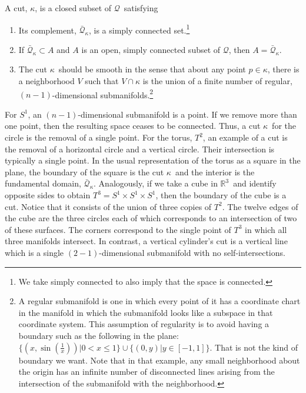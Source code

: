 \documentclass[11pt]{article}
\theoremstyle{remark}
\begin{document}
A cut, \ensuremath{\kappa}, is a closed subset of \ensuremath{\mathcal{Q}}\ satisfying
\begin{enumerate}
\item Its complement, \ensuremath{\bar{\ensuremath{\mathcal{Q}}}_{\ensuremath{\kappa}}}, is a simply connected
set.\footnote{We take simply connected to also imply that the space is
connected. 
}
\item If $\ensuremath{\bar{\ensuremath{\mathcal{Q}}}_{\ensuremath{\kappa}}} \subset A$ and $A$ is an open, simply connected
subset of \ensuremath{\mathcal{Q}}, then $A = \ensuremath{\bar{\ensuremath{\mathcal{Q}}}_{\ensuremath{\kappa}}}$.
\item The cut \ensuremath{\kappa}\ should be smooth in the sense that about any point
$p \in \ensuremath{\kappa}$, there is a neighborhood $V$ such that $V \cap \ensuremath{\kappa}$ is
the union of a finite number of regular, $(n-1)$-dimensional
submanifolds.\footnote{A regular
submanifold is one in which every point of it has a coordinate
chart in the manifold 
in which the submanifold looks like a subspace in that coordinate
system. This assumption of regularity 
is to avoid having a boundary such as the following in
the plane:  
$\{(x, \sin(\frac{1}{x}))| 0<x\leq 1\} \cup \{(0,y)| y \in [-1,1]\}$.
 That is not the kind of boundary we want. Note that in that
example, any small neighborhood about the origin has an
infinite number of disconnected  lines arising from 
the intersection of the submanifold
with the neighborhood.}   
\end{enumerate}


For $S^1$, an $(n-1)$-dimensional submanifold is a point. If we remove
more than one point, then the resulting space ceases to be
connected. Thus, a cut \ensuremath{\kappa}\ for the circle is the removal of a single
point. For the torus, $T^2$, an example of a cut is the removal of a
horizontal circle and a vertical circle. Their intersection is
typically a
single point. In the usual representation of the torus as a square in
the plane, the boundary of the square is the cut \ensuremath{\kappa}\ and the
interior is the fundamental domain, \ensuremath{\bar{\ensuremath{\mathcal{Q}}}_{\ensuremath{\kappa}}}. Analogously,
if we take a cube in \ensuremath{\mathbb{R}^{3}}\ and identify opposite sides to obtain
$T^3 = S^1\times S^1 \times S^1$, then the
boundary of the cube is a cut. Notice that it consists of the union
of three copies of $T^2$. The twelve edges of the cube are the
three circles each of which  corresponds to an intersection of two of these
surfaces. The corners
 correspond to the single point of $T^3$ in which all three
manifolds intersect.  In contrast, a vertical cylinder's cut is a vertical
line which is a single $(2-1)$-dimensional submanifold with no
self-intersections.  
\end{document}
